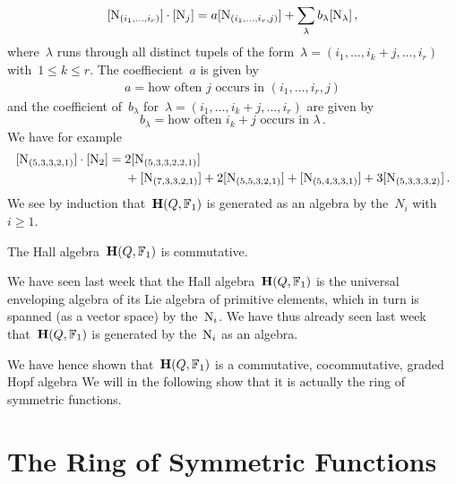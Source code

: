\documentclass[a4paper,11pt]{scrartcl}
\begin{document}
\begin{example}
\begin{enumerate}
      \[
        [ \mathrm{N}_{(i_1, \dotsc, i_r)} ] \cdot [ \mathrm{N}_j ]
        =
        a [ \mathrm{N}_{(i_1, \dotsc, i_r, j)} ]
        +
        \sum_{\lambda} b_\lambda [ \mathrm{N}_\lambda ] \,,
      \]
      where~$\lambda$ runs through all distinct tupels of the form~$\lambda = (i_1, \dotsc, i_k + j, \dotsc, i_r)$ with~$1 \leq k \leq r$.
      The coeffiecient~$a$ is given by
      \begin{align*}
        a
        =
        \text{how often~$j$ occurs in~$(i_1, \dotsc, i_r, j)$}
      \end{align*}
      and the coefficient of~$b_\lambda$ for~$\lambda = (i_1, \dotsc, i_k + j, \dotsc, i_r)$ are given by
      \[
        b_\lambda
        =
        \text{how often~$i_k + j$ occurs in~$\lambda$} \,.
      \]
      We have for example
      \begin{align*}
        [ \mathrm{N}_{(5, 3, 3, 2, 1)} ] \cdot [ \mathrm{N}_2 ]
        ={}&
          2 [ \mathrm{N}_{(5, 3, 3, 2, 2, 1)} ]
        \\
        {}&
        + [ \mathrm{N}_{(7, 3, 3, 2, 1)} ]
        + 2 [ \mathrm{N}_{(5, 5, 3, 2, 1)} ]
        +   [ \mathrm{N}_{(5, 4, 3, 3, 1)} ]
        + 3 [ \mathrm{N}_{(5, 3, 3, 3, 2)} ] \,.
      \end{align*}
      We see by induction that~$\mathbf{H}(Q, \mathbb{F}_1)$ is generated as an algebra by the~$N_i$ with~$i \geq 1$.
  \end{enumerate}
\end{example}

\begin{corollary}
  The Hall algebra~$\mathbf{H}(Q, \mathbb{F}_1)$ is commutative.
\end{corollary}

\begin{remark}
  We have seen last week that the Hall algebra~$\mathbf{H}(Q, \mathbb{F}_1)$ is the universal enveloping algebra of its Lie algebra of primitive elements, which in turn is spanned (as a vector space) by the~$\mathrm{N}_i$.
  We have thus already seen last week that~$\mathbf{H}(Q, \mathbb{F}_1)$ is generated by the~$\mathrm{N}_i$ as an algebra.
\end{remark}

We have hence shown that~$\mathbf{H}(Q, \mathbb{F}_1)$ is a commutative, cocommutative, graded Hopf algebra
We will in the following show that it is actually the ring of symmetric functions.





\section{The Ring of Symmetric Functions}
\end{document}
